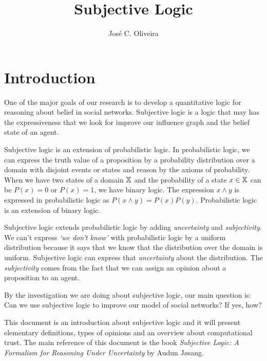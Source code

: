 \documentclass[a4paper,12pt]{article}
\title{Subjective Logic}
\author{José C. Oliveira}
\theoremstyle{definition}
\numberwithin{equation}{section}
\newcommand{\qm}[1]{`#1'}
\begin{document}
\maketitle

\section{Introduction}

One of the major goals of our research is to develop a quantitative logic for reasoning about belief in social networks. Subjective logic is a logic that may has the expressiveness that we look for improve our influence graph and the belief state of an agent.

Subjective logic is an extension of probabilistic logic. In probabilistic logic, we can express the truth value of a proposition by a probability distribution over a domain with disjoint events or states and reason by the axioms of probability. When we have two states of a domain $\mathbb{X}$ and the probability of a state $x \in \mathbb{X}$ can be $P(x) = 0$ or $P(x) = 1$, we have binary logic. The expression $x \land y$ is expressed in probabilistic logic as $P(x \land y) = P(x)P(y)$. Probabilistic logic is an extension of binary logic.

Subjective logic extends probabilistic logic by adding \emph{uncertainty} and \emph{subjectivity}. We can't express \emph{\qm{we don't know}} with probabilistic logic by a uniform distribution because it says that we know that the distribution over the domain is uniform. Subjective logic can express that \emph{uncertainty} about the distribution. The \emph{subjectivity} comes from the fact that we can assign an opinion about a proposition to an agent.

By the investigation we are doing about subjective logic, our main question is: Can we use subjective logic to improve our model of social networks? If yes, how?

This document is an introduction about subjective logic and it will present elementary definitions, types of opinions and an overview about computational trust. The main reference of this document is the book \emph{Subjective Logic: A Formalism for Reasoning Under Uncertainty} by Audun Jøsang.


%	
%	
%	
\end{document}
